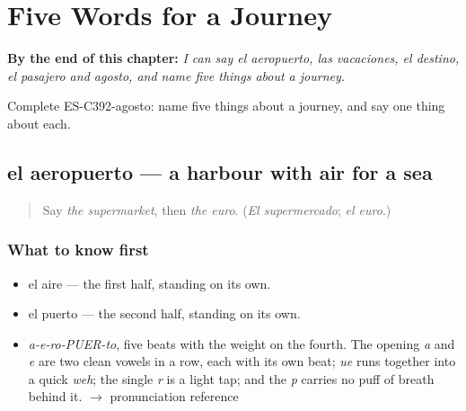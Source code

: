 
\chapter{Five Words for a Journey}
\label{ch:el-aeropuerto-y-las-vacaciones}

\begin{chapteropening}
\textbf{By the end of this chapter:} \emph{I can say el aeropuerto, las vacaciones, el destino, el pasajero and agosto, and name five things about a journey.}

Complete ES-C392-agosto: name five things about a journey, and say one thing about each.
\end{chapteropening}

\section[el aeropuerto]{el aeropuerto — a harbour with air for a sea}

\label{lesson:ES-C392-aeropuerto}



\begin{quote}
Say \emph{the supermarket}, then \emph{the euro}. (\emph{El supermercado}; \emph{el euro}.)
\end{quote}

\subsection*{What to know first}
\begin{itemize}
\raggedright
  \item el aire — the first half, standing on its own.
  \item el puerto — the second half, standing on its own.
\end{itemize}

\begin{sounds}
\begin{itemize}
\raggedright
  \item \emph{a-e-ro-PUER-to}, five beats with the weight on the fourth. The opening \emph{a} and \emph{e} are two clean vowels in a row, each with its own beat; \emph{ue} runs together into a quick \emph{weh}; the single \emph{r} is a light tap; and the \emph{p} carries no puff of breath behind it. $\to$ pronunciation reference
\end{itemize}
\end{sounds}

